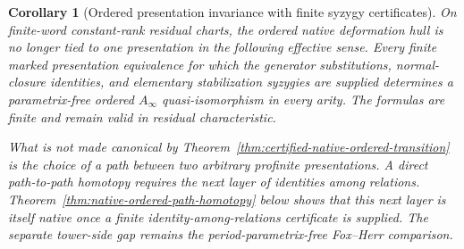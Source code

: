 \documentclass[11pt]{article}
\newtheorem{corollary}[theorem]{Corollary}
\theoremstyle{definition}
\begin{document}
\begin{corollary}[Ordered presentation invariance with finite syzygy certificates]\label{cor:ordered-presentation-certified-invariance}
On finite-word constant-rank residual charts, the ordered native deformation
hull is no longer tied to one presentation in the following effective sense.
Every finite marked presentation equivalence for which the generator
substitutions, normal-closure identities, and elementary stabilization
syzygies are supplied determines a parametrix-free ordered $A_\infty$
quasi-isomorphism in every arity.  The formulas are finite and remain valid in
residual characteristic.

What is not made canonical by Theorem~\ref{thm:certified-native-ordered-transition}
is the choice of a path between two arbitrary profinite presentations.  A
direct path-to-path homotopy requires the next layer of identities among
relations.  Theorem~\ref{thm:native-ordered-path-homotopy} below shows that
this next layer is itself native once a finite identity-among-relations
certificate is supplied.  The separate tower-side gap remains the
period-parametrix-free Fox--Herr comparison.
\end{corollary}
\end{document}
